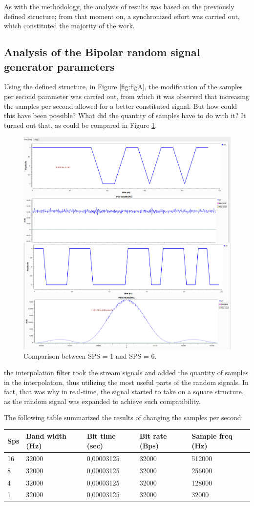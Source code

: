 \documentclass{journal}[IEEEtran, twocolumn]             %
\begin{document}
\begin{multicols}{2}
As with the methodology, the analysis of results was based on the previously defined structure; from that moment on, a synchronized effort was carried out, which constituted the majority of the work.

\subsection{Analysis of the Bipolar random signal generator parameters}

Using the defined structure, in Figure \ref{fig:figA}, the modification of the samples per second parameter was carried out, from which it was observed that increasing the samples per second allowed for a better constituted signal. But how could this have been possible? What did the quantity of samples have to do with it? It turned out that, as could be compared in Figure \ref{fig:FigC}.

\begin{figure}[H]
    \centering
        \centering
        \includegraphics[width=0.5\columnwidth]{figs/SP16.png}
    \caption{Comparison between SPS = 1 and SPS = 6.}
    \label{fig:FigC}
\end{figure}

the interpolation filter took the stream signals and added the quantity of samples in the interpolation, thus utilizing the most useful parts of the random signals. In fact, that was why in real-time, the signal started to take on a square structure, as the random signal was expanded to achieve such compatibility.

The following table summarized the results of changing the samples per second:

\begin{table}[H]
    \begin{tabular}{ |p{0.5cm}|p{1.1cm}|p{1.9cm}|p{1.1cm}|p{1.5cm}| }
    \hline
    \rowcolor{green!30}
    Sps & Band width (Hz) & Bit time (sec) & Bit rate (Bps) & Sample freq (Hz)\\
    \hline
    16 & 32000 & 0,00003125 & 32000 & 512000 \\
    8 & 32000 & 0,00003125 & 32000 & 256000 \\
    4 & 32000 & 0,00003125 & 32000 & 128000\\
    \hline
    \rowcolor{green!30}
    1 & 32000 & 0,00003125 & 32000 & 32000 \\
    \hline


\end{tabular}
\end{table}
\end{multicols}
\end{document}
